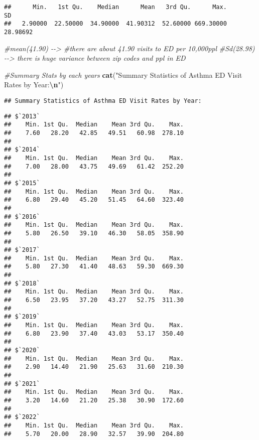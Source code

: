 \documentclass[
]{article}
\newenvironment{Shaded}{\begin{snugshade}}{\end{snugshade}}
\newcommand{\AttributeTok}[1]{\textcolor[rgb]{0.13,0.29,0.53}{#1}}
\newcommand{\CommentTok}[1]{\textcolor[rgb]{0.56,0.35,0.01}{\textit{#1}}}
\newcommand{\ConstantTok}[1]{\textcolor[rgb]{0.56,0.35,0.01}{#1}}
\newcommand{\FunctionTok}[1]{\textcolor[rgb]{0.13,0.29,0.53}{\textbf{#1}}}
\newcommand{\NormalTok}[1]{#1}
\newcommand{\SpecialCharTok}[1]{\textcolor[rgb]{0.81,0.36,0.00}{\textbf{#1}}}
\newcommand{\StringTok}[1]{\textcolor[rgb]{0.31,0.60,0.02}{#1}}
\begin{document}
\begin{verbatim}
##      Min.   1st Qu.    Median      Mean   3rd Qu.      Max.        SD 
##   2.90000  22.50000  34.90000  41.90312  52.60000 669.30000  28.98692
\end{verbatim}

\begin{Shaded}
\begin{Highlighting}[]
\CommentTok{\#mean(41.90) {-}{-}\textgreater{} \#there are about 41.90 visits to ED per 10,000ppl}
\CommentTok{\#Sd(28.98) {-}{-}\textgreater{} there is huge variance between zip codes and ppl in ED }
\end{Highlighting}
\end{Shaded}

\begin{Shaded}
\begin{Highlighting}[]
\CommentTok{\#Summary Stats by each years}
\FunctionTok{cat}\NormalTok{(}\StringTok{"Summary Statistics of Asthma ED Visit Rates by Year:}\SpecialCharTok{\textbackslash{}n}\StringTok{"}\NormalTok{)}
\end{Highlighting}
\end{Shaded}

\begin{verbatim}
## Summary Statistics of Asthma ED Visit Rates by Year:
\end{verbatim}

\begin{Shaded}
\end{Shaded}

\begin{verbatim}
## $`2013`
##    Min. 1st Qu.  Median    Mean 3rd Qu.    Max. 
##    7.60   28.20   42.85   49.51   60.98  278.10 
## 
## $`2014`
##    Min. 1st Qu.  Median    Mean 3rd Qu.    Max. 
##    7.00   28.00   43.75   49.69   61.42  252.20 
## 
## $`2015`
##    Min. 1st Qu.  Median    Mean 3rd Qu.    Max. 
##    6.80   29.40   45.20   51.45   64.60  323.40 
## 
## $`2016`
##    Min. 1st Qu.  Median    Mean 3rd Qu.    Max. 
##    5.80   26.50   39.10   46.30   58.05  358.90 
## 
## $`2017`
##    Min. 1st Qu.  Median    Mean 3rd Qu.    Max. 
##    5.80   27.30   41.40   48.63   59.30  669.30 
## 
## $`2018`
##    Min. 1st Qu.  Median    Mean 3rd Qu.    Max. 
##    6.50   23.95   37.20   43.27   52.75  311.30 
## 
## $`2019`
##    Min. 1st Qu.  Median    Mean 3rd Qu.    Max. 
##    6.80   23.90   37.40   43.03   53.17  350.40 
## 
## $`2020`
##    Min. 1st Qu.  Median    Mean 3rd Qu.    Max. 
##    2.90   14.40   21.90   25.63   31.60  210.30 
## 
## $`2021`
##    Min. 1st Qu.  Median    Mean 3rd Qu.    Max. 
##    3.20   14.60   21.20   25.38   30.90  172.60 
## 
## $`2022`
##    Min. 1st Qu.  Median    Mean 3rd Qu.    Max. 
##    5.70   20.00   28.90   32.57   39.90  204.80
\end{verbatim}
\end{document}
